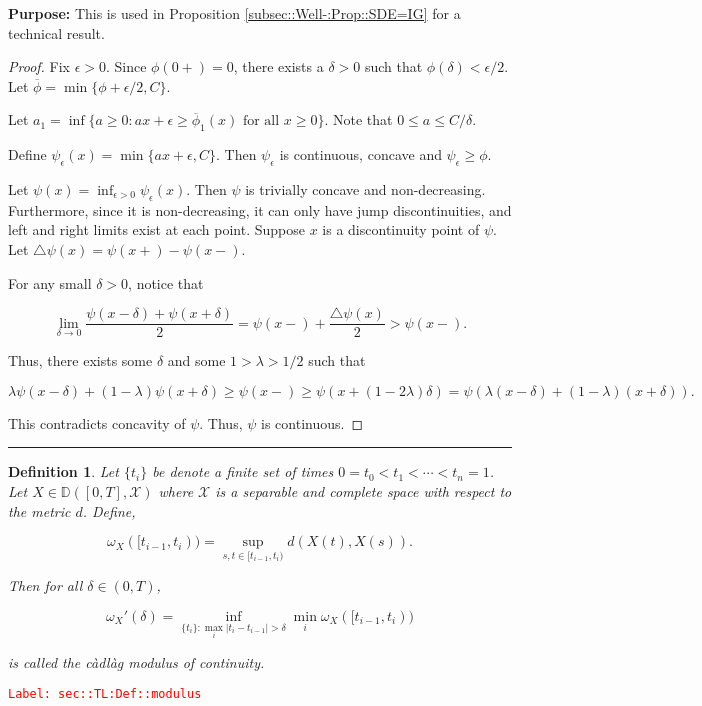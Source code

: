 \documentclass[12pt]{article}
\newcommand{\mb}{\mathbb}
\newcommand{\mc}{\mathcal}
\newcommand{\ra}{\rightarrow}
\newcommand{\ov}{\overline}
\newcommand{\te}{\text}
\newcommand{\ep}{\epsilon}
\newcommand{\tr}{\textcolor{red}}
\newcommand{\labe}[1]{\tr{\texttt{Label: #1}}}
\newcommand{\purpose}{\textbf{Purpose: }}
\newcommand{\ind}{\hspace{24pt}}
\newcommand{\lin}{\rule{\linewidth}{0.4 pt}}
\newcommand{\cad}{\mb{D}}							%
\newtheorem{defn}[thms]{Definition}
\begin{document}
\purpose This is used in Proposition \ref{subsec::Well-:Prop::SDE=IG} for a technical result.

\begin{proof}
Fix \(\ep > 0\). Since \(\phi(0+) = 0\), there exists a \(\delta > 0\) such that \(\phi(\delta) < \ep/2\). Let \(\ov{\phi} = \min\{\phi+\ep/2, C\}\).

\ind Let \(a_1 = \inf\{a \geq 0: ax + \ep \geq \ov{\phi}_1(x)\te{ for all } x\geq 0\}\). Note that \(0\leq a \leq C/\delta\). 

\ind Define \(\psi_\ep(x) = \min\{ax+\ep,C\}\). Then \(\psi_\ep\) is continuous, concave and \(\psi_\ep \geq \phi\).

\ind Let \(\psi(x) = \inf_{\ep > 0} \psi_\ep(x)\). Then \(\psi\) is trivially concave and non-decreasing. Furthermore, since it is non-decreasing, it can only have jump discontinuities, and left and right limits exist at each point. Suppose \(x\) is a discontinuity point of \(\psi\). Let \(\triangle\psi(x) = \psi(x+) - \psi(x-)\).

For any small \(\delta > 0\), notice that

\[\lim_{\delta \ra 0} \frac{\psi(x-\delta) + \psi(x+\delta)}{2} = \psi(x-) + \frac{\triangle\psi(x)}{2} > \psi(x-).\]

Thus, there exists some \(\delta\) and some \(1>\lambda>1/2\) such that

\[\lambda\psi(x-\delta) + (1 -\lambda)\psi(x+\delta) \geq \psi(x-) \geq \psi(x + (1 - 2\lambda)\delta) = \psi\left(\lambda(x-\delta) + (1 - \lambda)(x+\delta)\right).\]

This contradicts concavity of \(\psi\). Thus, \(\psi\) is continuous.
\end{proof}

\lin

\begin{defn}
Let \(\{t_i\}\) be denote a finite set of times \(0=t_0 <t_1 <\cdots < t_n=1\). Let \(X\in \cad([0,T],\mc{X})\) where \(\mc{X}\) is a separable and complete space with respect to the metric \(d\). Define,

\[\omega_X([t_{i-1},t_i)) = \sup_{s,t\in [t_{i-1},t_i)} d(X(t),X(s)).\]

Then for all \(\delta \in (0,T)\),

\[\omega_X'(\delta) = \inf_{\{t_i\}: \max_i |t_i - t_{i-1}| > \delta} \min_{i} \omega_X([t_{i-1},t_i))\]

is called the c\`adl\`ag modulus of continuity.
\label{sec::TL:Def::modulus}
\end{defn}
\labe{sec::TL:Def::modulus}
\end{document}
